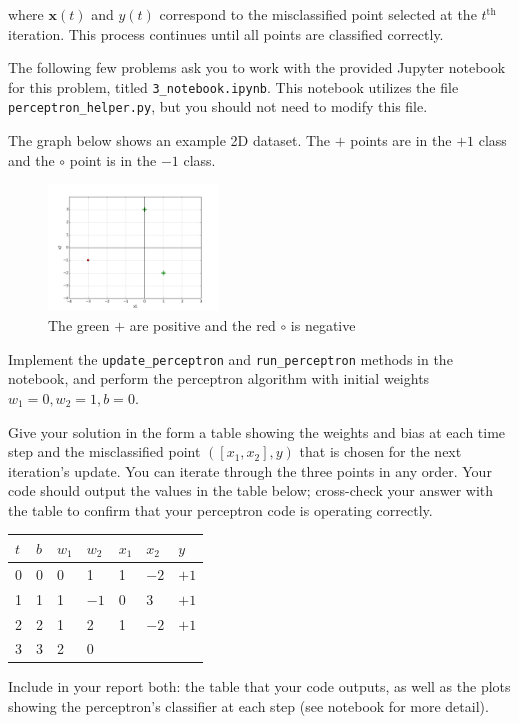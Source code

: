 where $\mathbf{x}(t)$ and $y(t)$ correspond to the misclassified point selected at the $t^\text{th}$ iteration.
This process continues until all points are classified correctly.

The following few problems ask you to work with the provided Jupyter notebook for this problem, titled \texttt{3_notebook.ipynb}. This notebook utilizes the file \texttt{perceptron_helper.py}, but you should not need to modify this file.

\begin{problem}[8]
The graph below shows an example 2D dataset.
The $+$ points are in the $+1$ class and the $\circ$ point is in the $-1$ class.

\begin{figure}[H]
	\centering
	\includegraphics[width=0.4\textwidth]{images/perceptron.png}
	\caption{The green $+$ are positive and the red $\circ$ is negative}
	\label{fig:figure1}
\end{figure}

Implement the \texttt{update_perceptron} and \texttt{run_perceptron} methods in the notebook, and perform the perceptron algorithm with initial weights $w_1 = 0, w_2 = 1, b = 0$.

Give your solution in the form a table showing the weights and bias at each time step and the misclassified point $([x_1,x_2],y)$ that is chosen for the next iteration's update.
You can iterate through the three points in any order.
Your code should output the values in the table below; cross-check your answer with the table to confirm that your perceptron code is operating correctly.

\begin{table}[H]
	\centering

	\begin{tabular}{l|lll|ll|l}
		\hline

		\hline
		$t$ & $b$ & $w_1$ & $w_2$ & $x_1$ & $x_2$ & $y$  \\
		\hline
		0   & 0   & 0     & 1     & 1     & $-2$  & $+1$ \\
		1   & 1   & 1     & $-1$  & 0     & 3     & $+1$ \\
		2   & 2   & 1     & 2     & 1     & $-2$  & $+1$ \\
		3   & 3   & 2     & 0                            \\
		\hline
	\end{tabular}
\end{table}

Include in your report both: the table that your code outputs, as well as the plots showing the perceptron's classifier at each step (see notebook for more detail).


\end{problem}
